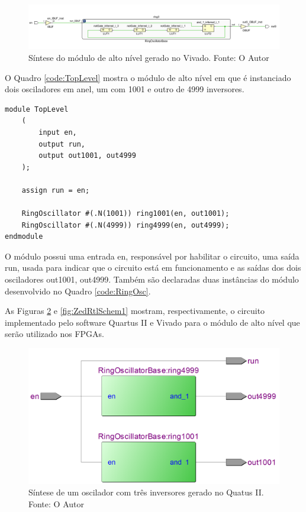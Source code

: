 \begin{figure}[H]
    \centering
    \includegraphics[width=\linewidth]{figures/ZedBoard_Implementation_3Inverter.png}
    \caption{Síntese do módulo de alto nível gerado no Vivado. Fonte: O Autor}
    \label{fig:ZedImp3Osc}
\end{figure}

O Quadro \ref{code:TopLevel} mostra o módulo de alto nível em que é instanciado dois osciladores em anel, um com 1001 e outro de 4999 inversores. 

\begin{lstlisting}[label={code:TopLevel}, style=VerilogStyle, caption={Estanciamento dos Módulos. Fonte: O Autor}]
module TopLevel
	(
		input en,
		output run,
		output out1001, out4999
	);
	
	assign run = en;

	RingOscillator #(.N(1001)) ring1001(en, out1001);
	RingOscillator #(.N(4999)) ring4999(en, out4999);
endmodule
\end{lstlisting}

O módulo possui uma entrada en, responsável por habilitar o circuito, uma saída run, usada para indicar que o circuito está em funcionamento e as saídas dos dois osciladores out1001, out4999. Também são declaradas duas instâncias do módulo desenvolvido no Quadro \ref{code:RingOsc}.

As Figuras \ref{fig:DE2RtlSchem} e \ref{fig:ZedRtlSchem1} mostram, respectivamente, o circuito implementado pelo software Quartus II e Vivado para o módulo de alto nível que serão utilizado nos FPGAs.

\begin{figure}[H]
    \centering
    \includegraphics[scale=0.25]{figures/DE2_RTL_Schematic.png}
    \caption{Síntese de um oscilador com três inversores gerado no Quatus II. Fonte: O Autor}
    \label{fig:DE2RtlSchem}
\end{figure}

